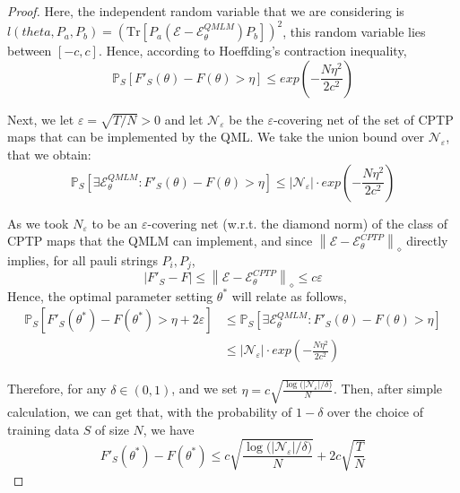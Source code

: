 \documentclass[%
 reprint,
 amsmath,amssymb,
 aps,
]{revtex4-2}
\newcommand{\E}{\mathcal{E}}
\newcommand{\norm}[1]{\left\lVert#1\right\rVert}
\begin{document}
\begin{proof}
    Here, the independent random variable that we are considering is $l(theta, P_a, P_b)=\left(\mathrm{Tr}\left[P_a(\E-\E^{QMLM}_\theta)P_b\right]\right)^2$, this random variable lies between $[-c, c]$. Hence, according to Hoeffding's contraction inequality, 
    \begin{equation}
        \mathbb{P}_S\left[F'_S(\theta)-F(\theta)> \eta \right] \le exp\left(-\frac{N\eta^2}{2c^2}\right)
    \end{equation}

    Next, we let $\varepsilon=\sqrt{T/N} >0$ and let $\mathcal{N}_\varepsilon$ be the $\varepsilon$-covering net of the set of CPTP maps that can be implemented by the QML.  We take the union bound over $\mathcal{N}_\varepsilon$, that we obtain:
    \begin{equation}
        \mathbb{P}_S\left[\exists \E^{QMLM}_\theta:F'_S(\theta)-F(\theta)> \eta \right] \le |\mathcal{N}_\varepsilon| \cdot exp\left(-\frac{N\eta^2}{2c^2}\right)
    \end{equation}

    As we took $N_\varepsilon$ to be an $\varepsilon$-covering net (w.r.t. the diamond norm) of the class of CPTP maps that the QMLM can implement, and since $\norm{\E-\E^{CPTP}_\theta}_\diamond$ directly implies, for all pauli strings $P_i, P_j$,
    \begin{equation}
        |F'_S-F|\le\norm{\E-\E^{CPTP}_\theta}_\diamond\le c\varepsilon
    \end{equation}
    Hence, the optimal parameter setting $\theta^*$ will relate as follows,
    \begin{equation}
    \begin{split}
        \mathbb{P}_S\left[F'_S(\theta^*)-F(\theta^*)> \eta +2\varepsilon \right] &\le \mathbb{P}_S\left[\exists \E^{QMLM}_\theta:F'_S(\theta)-F(\theta)> \eta \right]\\
        &\le |\mathcal{N}_\varepsilon| \cdot exp\left(-\frac{N\eta^2}{2c^2}\right)
    \end{split}
    \end{equation}

    Therefore, for any $\delta \in (0, 1)$, and we set $\eta = c\sqrt{\frac{\log{(|\mathcal{N}_\varepsilon|/\delta})}{N}}$. Then, after simple calculation, we can get that, with the probability of $1-\delta$ over the choice of training data $S$ of size $N$, we have 
    \begin{equation}
        F'_S(\theta^*)-F(\theta^*)\le c\sqrt{\frac{\log{(|\mathcal{N}_\varepsilon|/\delta})}{N}}+2c\sqrt{\frac{T}{N}}
    \end{equation}


\end{proof}
\end{document}
